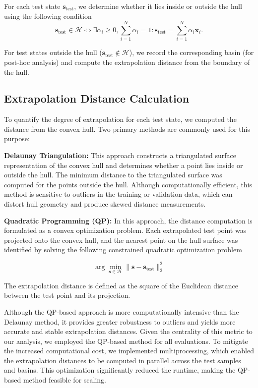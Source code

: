 \documentclass{article}
\begin{document}
For each test state $\mathbf{s}_{\text{test}}$, we determine whether it lies inside or outside the hull using the following condition
\begin{equation}
\mathbf{s}_{\text{test}} \in \mathcal{H} \iff \exists \alpha_i \geq 0, \sum_{i=1}^{N} \alpha_i = 1 : \mathbf{s}_{\text{test}} = \sum_{i=1}^{N} \alpha_i \mathbf{x}_i.
\end{equation}

For test states outside the hull ($\mathbf{s}_{\text{test}} \notin \mathcal{H}$), we record the corresponding basin (for post-hoc analysis) and compute the extrapolation distance from the boundary of the hull.

\subsection{Extrapolation Distance Calculation}

To quantify the degree of extrapolation for each test state, we computed the distance from the convex hull. Two primary methods are commonly used for this purpose:

\textbf{Delaunay Triangulation:\cite{luo2021deepdt}} This approach constructs a triangulated surface representation of the convex hull and determines whether a point lies inside or outside the hull. The minimum distance to the triangulated surface was computed for the points outside the hull. Although computationally efficient, this method is sensitive to outliers in the training or validation data, which can distort hull geometry and produce skewed distance measurements.

\textbf{Quadratic Programming (QP):\cite{chen2024convex}} In this approach, the distance computation is formulated as a convex optimization problem. Each extrapolated test point was projected onto the convex hull, and the nearest point on the hull surface was identified by solving the following constrained quadratic optimization problem

\[
\arg\min_{\mathbf{s} \in \mathcal{H}} \|\mathbf{s} - \mathbf{s}_{\text{test}}\|_2^2
\]


The extrapolation distance is defined as the square of the Euclidean distance between the test point and its projection.

Although the QP-based approach is more computationally intensive than the Delaunay method, it provides greater robustness to outliers and yields more accurate and stable extrapolation distances. Given the centrality of this metric to our analysis, we employed the QP-based method for all evaluations. To mitigate the increased computational cost, we implemented multiprocessing, which enabled the extrapolation distances to be computed in parallel across the test samples and basins. This optimization significantly reduced the runtime, making the QP-based method feasible for scaling.
\end{document}
